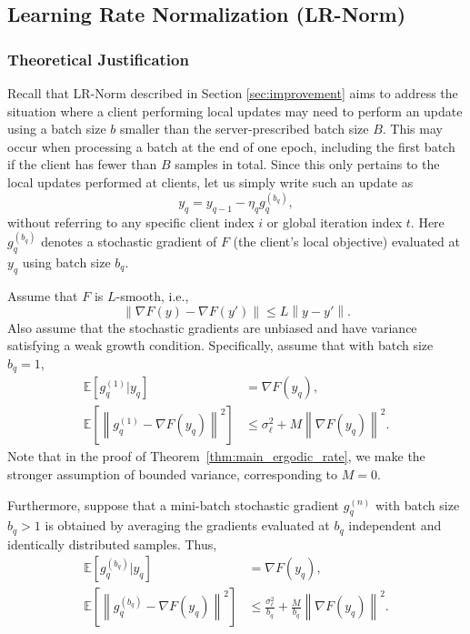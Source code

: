 \documentclass[twoside]{article}
\newcommand{\norm}[1]{\left\lVert#1\right\rVert}
\newcommand{\lrn}{{LR-Norm}\xspace}
\begin{document}
\subsection{Learning Rate Normalization (\lrn{})}
\label{sec:appendix_lrn}
\subsubsection{Theoretical Justification}

Recall that \lrn{} described in Section \ref{sec:improvement} aims to address the situation where a client performing local updates may need to perform an update using a batch size $b$ smaller than the server-prescribed batch size $B$. This may occur when processing a batch at the end of one epoch, including the first batch if the client has fewer than $B$ samples in total. Since this only pertains to the local updates performed at clients, let us simply write such an update as
\begin{equation} \label{eq:sgd_varying_batch}
y_q = y_{q-1} - \eta_q g_q^{(b_q)},
\end{equation}
without referring to any specific client index $i$ or global iteration index $t$. Here $g_q^{(b_q)}$ denotes a stochastic gradient of $F$ (the client's local objective) evaluated at $y_q$ using batch size $b_q$.

Assume that $F$ is $L$-smooth, i.e.,
\[
\norm{\nabla F(y) - \nabla F(y')} \le L \norm{y - y'}.
\]
Also assume that the stochastic gradients are unbiased and have variance satisfying a weak growth condition. Specifically, assume that with batch size $b_q=1$,
\begin{align*}
\mathbb{E}[g_q^{(1)} | y_q] &= \nabla F(y_q), \\
\mathbb{E}[ \norm{g_q^{(1)} - \nabla F(y_q)}^2] &\le \sigma_\ell^2 + M \norm{\nabla F(y_q)}^2.
\end{align*}
Note that in the proof of Theorem~\ref{thm:main_ergodic_rate}, we make the stronger assumption of bounded variance, corresponding to $M=0$.

Furthermore, suppose that a mini-batch stochastic gradient $g_q^{(n)}$ with batch size $b_q > 1$ is obtained by averaging the gradients evaluated at $b_q$ independent and identically distributed samples. Thus,
\begin{align*}
\mathbb{E}[g_q^{(b_q)} | y_q] &= \nabla F(y_q), \\
\mathbb{E}[ \norm{g_q^{(b_q)} - \nabla F(y_q)}^2] &\le \frac{\sigma_\ell^2}{b_q} + \frac{M}{b_q} \norm{\nabla F(y_q)}^2.
\end{align*}
\end{document}
